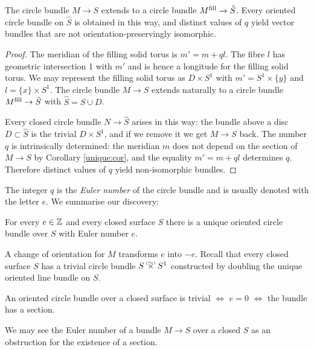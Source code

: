 \begin{prop} \label{classify:bundles:prop}
The circle bundle $M\to S$ extends to a circle bundle $M^{\rm fill}\to \hat S$. Every oriented circle bundle on $\hat S$ is obtained in this way, and distinct values of $q$ yield vector bundles that are not orientation-preservingly isomorphic.
\end{prop}
\begin{proof}
The meridian of the filling solid torus is $m'=m + ql$. The fibre $l$ has geometric intersection 1 with $m'$ and is hence a longitude for the filling solid torus. We may represent the filling solid torus as $D \times S^1$ with $m' = S^1 \times \{y\}$ and $l=\{x\}\times S^1$. The circle bundle $M\to S$ extends naturally to a circle bundle $M^{\rm fill} \to \hat S$ with $\hat S = S\cup D$.

Every closed circle bundle $N\to \hat S$ arises in this way: the bundle above a disc $D\subset \hat S$ is the trivial $D\times S^1$, and if we remove it we get $M \to S$ back. 
The number $q$ is intrinsically determined: the meridian $m$ does not depend on the section of $M\to S$ by Corollary \ref{unique:cor}, and the equality $m' = m+ql$ determines $q$. Therefore distinct values of $q$ yield non-isomorphic bundles.
\end{proof}

The integer $q$ is the \emph{Euler number} of the circle bundle and is usually denoted with the letter $e$. We summarise our discovery:
\begin{cor} \label{unique:e:cor}
For every $e\in \mathbb{Z}$ and every closed surface $S$ there is a unique oriented circle bundle over $S$ with Euler number $e$.
\end{cor}

A change of orientation for $M$ transforms $e$ into $-e$.
Recall that every closed surface $S$ has a trivial circle bundle $S\timforsetil S^1$ constructed by doubling the unique oriented line bundle on $S$.

\begin{ex} \label{circle:bundle:ex}
An oriented circle bundle over a closed surface is trivial $\Longleftrightarrow$ $e=0$ $\Longleftrightarrow$ the bundle has a section. 
\end{ex}

We may see the Euler number of a bundle $M\to S$ over a closed $S$ as an obstruction for the existence of a section.

